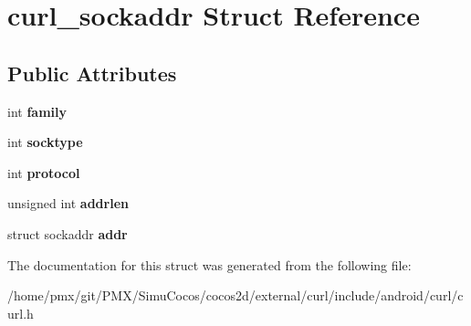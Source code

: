 \hypertarget{structcurl__sockaddr}{}\section{curl\+\_\+sockaddr Struct Reference}
\label{structcurl__sockaddr}
\subsection*{Public Attributes}
\begin{DoxyCompactItemize}
\item 
\mbox{\label{structcurl__sockaddr_ad5406982faaa070b7c928686ed31fdae}} 
int {\bfseries family}
\item 
\mbox{\label{structcurl__sockaddr_a2c6c2c2083f3436c8b46c7d658be9aca}} 
int {\bfseries socktype}
\item 
\mbox{\label{structcurl__sockaddr_ab59abd90c680d1f37217c3f65ea58a02}} 
int {\bfseries protocol}
\item 
\mbox{\label{structcurl__sockaddr_a284d80484bad142443fe26ddbe427ff2}} 
unsigned int {\bfseries addrlen}
\item 
\mbox{\label{structcurl__sockaddr_afb5fbd416cdfa9f83791e9a23e5266c2}} 
struct sockaddr {\bfseries addr}
\end{DoxyCompactItemize}


The documentation for this struct was generated from the following file\+:\begin{DoxyCompactItemize}
\item 
/home/pmx/git/\+P\+M\+X/\+Simu\+Cocos/cocos2d/external/curl/include/android/curl/curl.\+h\end{DoxyCompactItemize}
